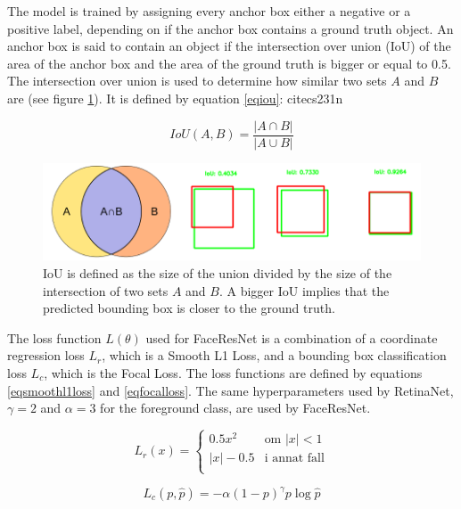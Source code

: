 \documentclass[a4paper,11pt,twoside]{article}
\begin{document}
The model is trained by assigning every anchor box either a negative or a positive label, depending on if the anchor box contains a ground truth object. An anchor box is said to contain an object if the intersection over union (IoU) of the area of the anchor box and the area of the ground truth is bigger or equal to 0.5. The intersection over union is used to determine how similar two sets $A$ and $B$ are (see figure \ref{figiou}). It is defined by equation \eqref{eqiou}: cite{cs231n} \cite{iou}

\begin{equation}\label{eqiou}
IoU(A, B)=\frac{|A \cap B|}{|A \cup B|}
\end{equation}

\begin{figure}[h]
	\centering
  		\includegraphics[scale=0.5]{iou.png}
  	\caption{IoU is defined as the size of the union divided by the size of the intersection of two sets $A$ and $B$. A bigger IoU implies that the predicted bounding box is closer to the ground truth. \cite{iou}} \label{figiou}
\end{figure}

The loss function $L(\theta)$ used for FaceResNet is a combination of a coordinate regression loss $L_r$, which is a Smooth L1 Loss, and a bounding box classification loss $L_c$, which is the Focal Loss. The loss functions are defined by equations \eqref{eqsmoothl1loss} and \eqref{eqfocalloss}. The same hyperparameters used by RetinaNet, $\gamma=2$ and $\alpha = 3$ for the foreground class, are used by FaceResNet. \cite{retinanet}

\begin{equation}\label{eqfocalloss}
L_r(x) = \begin{cases}
				0.5x^2 & \mbox{om } |x| < 1\\
				|x| - 0.5 & \mbox{i annat fall}\\
			\end{cases}
\end{equation}

\begin{equation}\label{eqsmoothl1loss}
L_c(p, \hat{p}) = - \alpha (1-p)^{\gamma}p \log{\hat{p}}
\end{equation}
\end{document}
